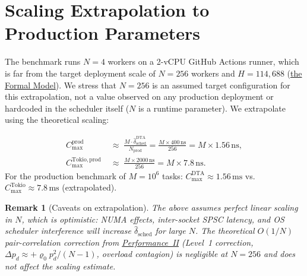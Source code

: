 \documentclass[11pt,a4paper]{article}
\newtheorem{remark}{Remark}[section]
\begin{document}
\section{Scaling Extrapolation to Production Parameters}\label{sec:validity}

The benchmark runs $N=4$ workers on a 2-vCPU GitHub Actions runner,
which is far from the target deployment scale of $N=256$ workers and
$H=114{,}688$ (\hyperref[chap:formal_model]{the Formal Model}). We
stress that $N=256$ is an assumed target configuration for this
extrapolation, not a value observed on any production deployment or
hardcoded in the scheduler itself ($N$ is a runtime parameter). We
extrapolate using the theoretical scaling:

\begin{align}
  C_{\max}^{\mathrm{prod}}
  &\;\approx\; \frac{M \cdot \hat\delta_{\mathrm{sched}}^{\mathrm{DTA}}}{N_{\mathrm{prod}}}
  = \frac{M \times 400\,\mathrm{ns}}{256}
  = M \times 1.56\,\mathrm{ns}, \\
  C_{\max}^{\mathrm{Tokio,prod}}
  &\;\approx\; \frac{M \times 2000\,\mathrm{ns}}{256}
  = M \times 7.8\,\mathrm{ns}.
\end{align}
For the production benchmark of $M = 10^6$ tasks:
$C_{\max}^{\mathrm{DTA}} \approx 1.56\,\mathrm{ms}$
vs.\ $C_{\max}^{\mathrm{Tokio}} \approx 7.8\,\mathrm{ms}$ (extrapolated).

\begin{remark}[Caveats on extrapolation]
The above assumes perfect linear scaling in $N$, which is optimistic:
NUMA effects, inter-socket SPSC latency, and OS scheduler interference
will increase $\hat\delta_{\mathrm{sched}}$ for large $N$.
The theoretical $O(1/N)$ pair-correlation correction from
\hyperref[chap:kinetic_theory]{Performance~II} (Level~1 correction, $\Delta p_d \approx
+\varrho_0 p_d^2/(N-1)$, overload contagion) is negligible at $N=256$ and does not affect
the scaling estimate.
\end{remark}
\end{document}
